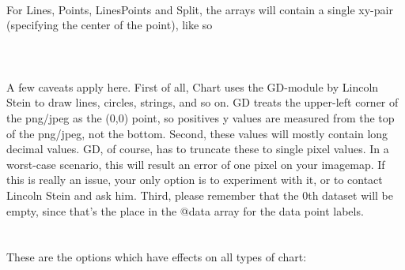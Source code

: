 \\
\\
\\ 
For Lines, Points, LinesPoints and Split, the arrays will contain a single xy-pair (specifying the center of the point), like so\\
\\
\\
\\
A few caveats apply here. First of all, Chart uses the GD-module by Lincoln Stein to draw lines, circles, strings, and so on. GD treats the upper-left corner of the png/jpeg as the (0,0) point, so positives y values are measured from the top of the png/jpeg, not the bottom. Second, these values will mostly contain long decimal values. GD, of course, has to truncate these to single pixel values. In a worst-case scenario, this will result an error of one pixel on your imagemap. If this is really an issue, your only option is to experiment with it, or to contact Lincoln Stein and ask him. Third, please remember that the 0th dataset will be empty, since that's the place in the @data array for the data point labels.\\
\\
\\   
\label{options} These are the options which have effects on all types of chart:
